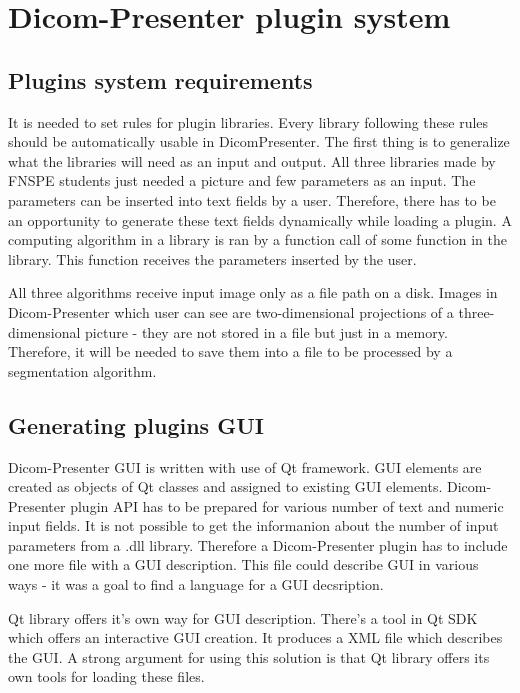 \section*{Dicom-Presenter plugin system}

\subsection*{Plugins system requirements}

It is needed to set rules for plugin libraries. Every library following these rules should be automatically usable in DicomPresenter. The first thing is to generalize what the libraries will need as an input and output. All three libraries made by FNSPE students just needed a picture and few parameters as an input. The parameters can be inserted into text fields by a user. Therefore, there has to be an opportunity to generate these text fields dynamically while loading a plugin. A computing algorithm in a library is ran by a function call of some function in the library. This function receives the parameters inserted by the user.

All three algorithms receive input image only as a file path on a disk. Images in Dicom-Presenter which user can see are two-dimensional projections of a three-dimensional picture - they are not stored in a file but just in a memory. Therefore, it will be needed to save them into a file to be processed by a segmentation algorithm.

\subsection*{Generating plugins GUI}

Dicom-Presenter GUI is written with use of Qt framework. GUI elements are created as objects of Qt classes and assigned to existing GUI elements. Dicom-Presenter plugin API has to be prepared for various number of text and numeric input fields. It is not possible to get the informanion about the number of input parameters from a .dll library. Therefore a Dicom-Presenter plugin has to include one more file with a GUI description. This file could describe GUI in various ways - it was a goal to find a language for a GUI decsription.

Qt library offers it's own way for GUI description. There's a tool in Qt SDK which offers an interactive GUI creation. It produces a XML file which describes the GUI. A strong argument for using this solution is that Qt library offers its own tools for loading these files.

